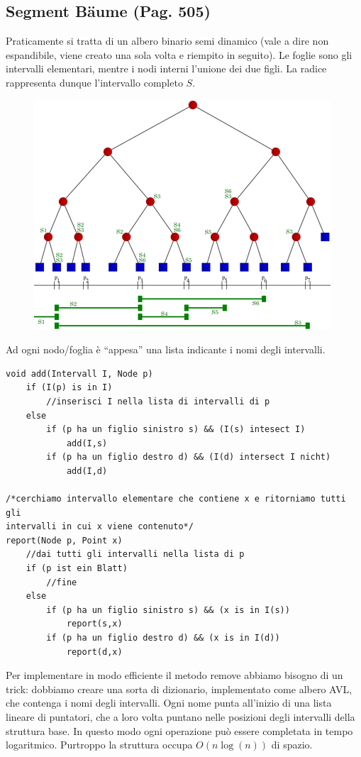 \documentclass[a4paper]{book}
\newcommand{\lstIndent}{4}
\begin{document}
\subsection{Segment Bäume (Pag. 505)}
Praticamente si tratta di un albero binario semi dinamico (vale a dire non espandibile, viene creato una sola volta e riempito in seguito). Le foglie sono gli intervalli elementari, mentre i nodi interni l'unione dei due figli. La radice rappresenta dunque l'intervallo completo $S$.
\begin{figure}[H]
\centering
\includegraphics[scale=0.7]{Figures/segmenttree.png}
\end{figure}
Ad ogni nodo/foglia è ``appesa'' una lista indicante i nomi degli intervalli.
\begin{lstlisting}[tabsize=\lstIndent]
void add(Intervall I, Node p)
	if (I(p) is in I)
		//inserisci I nella lista di intervalli di p
	else
		if (p ha un figlio sinistro s) && (I(s) intesect I)
			add(I,s)
		if (p ha un figlio destro d) && (I(d) intersect I nicht)
			add(I,d)
			
/*cerchiamo intervallo elementare che contiene x e ritorniamo tutti gli 
intervalli in cui x viene contenuto*/			
report(Node p, Point x)
	//dai tutti gli intervalli nella lista di p	
	if (p ist ein Blatt)
		//fine
	else
		if (p ha un figlio sinistro s) && (x is in I(s))
			report(s,x)
		if (p ha un figlio destro d) && (x is in I(d))
			report(d,x)				
\end{lstlisting}
Per implementare in modo efficiente il metodo remove abbiamo bisogno di un trick: dobbiamo creare una sorta di dizionario, implementato come albero AVL, che contenga i nomi degli intervalli. Ogni nome punta all'inizio di una lista lineare di puntatori, che a loro volta puntano nelle posizioni degli intervalli della struttura base. In questo modo ogni operazione può essere completata in tempo logaritmico. Purtroppo la struttura occupa $O(n \log(n))$ di spazio.
\end{document}
